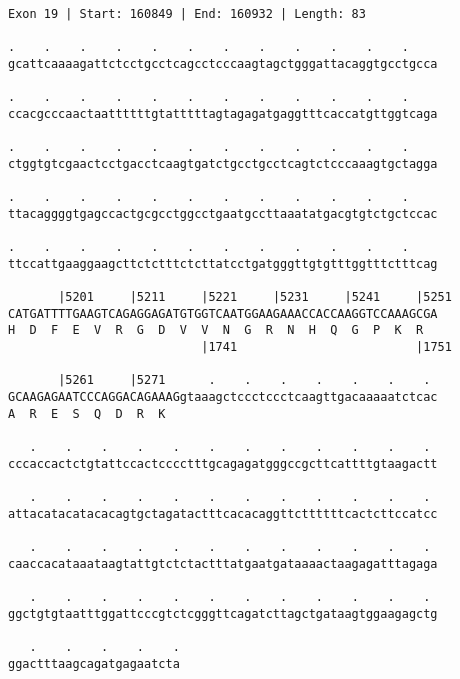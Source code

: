 \documentclass{article}
\begin{document}
\begin{Verbatim}[fontfamily=courier]
Exon 19 | Start: 160849 | End: 160932 | Length: 83

.    .    .    .    .    .    .    .    .    .    .    .    
gcattcaaaagattctcctgcctcagcctcccaagtagctgggattacaggtgcctgcca

.    .    .    .    .    .    .    .    .    .    .    .    
ccacgcccaactaattttttgtatttttagtagagatgaggtttcaccatgttggtcaga

.    .    .    .    .    .    .    .    .    .    .    .    
ctggtgtcgaactcctgacctcaagtgatctgcctgcctcagtctcccaaagtgctagga

.    .    .    .    .    .    .    .    .    .    .    .    
ttacaggggtgagccactgcgcctggcctgaatgccttaaatatgacgtgtctgctccac

.    .    .    .    .    .    .    .    .    .    .    .    
ttccattgaaggaagcttctctttctcttatcctgatgggttgtgtttggtttctttcag

       |5201     |5211     |5221     |5231     |5241     |5251
CATGATTTTGAAGTCAGAGGAGATGTGGTCAATGGAAGAAACCACCAAGGTCCAAAGCGA
H  D  F  E  V  R  G  D  V  V  N  G  R  N  H  Q  G  P  K  R  
                           |1741                         |1751

       |5261     |5271      .    .    .    .    .    .    . 
GCAAGAGAATCCCAGGACAGAAAGgtaaagctccctccctcaagttgacaaaaatctcac
A  R  E  S  Q  D  R  K                                      

   .    .    .    .    .    .    .    .    .    .    .    . 
cccaccactctgtattccactcccctttgcagagatgggccgcttcattttgtaagactt

   .    .    .    .    .    .    .    .    .    .    .    . 
attacatacatacacagtgctagatactttcacacaggttcttttttcactcttccatcc

   .    .    .    .    .    .    .    .    .    .    .    . 
caaccacataaataagtattgtctctactttatgaatgataaaactaagagatttagaga

   .    .    .    .    .    .    .    .    .    .    .    . 
ggctgtgtaatttggattcccgtctcgggttcagatcttagctgataagtggaagagctg

   .    .    .    .    .
ggactttaagcagatgagaatcta
\end{Verbatim}
\newpage
\end{document}
